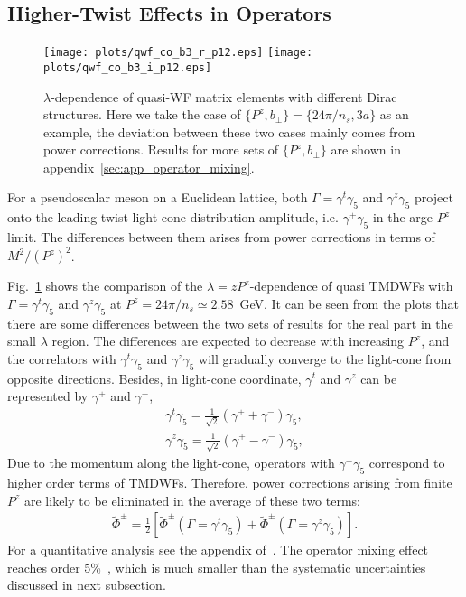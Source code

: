 \documentclass[prd,aps,twocolumn,preprintnumbers, showpacs, nofootinbib,superscriptaddress,notitlepage]{revtex4-1}
\begin{document}
\subsection{Higher-Twist Effects in Operators}
\label{sec:operator}


\begin{figure}
\centering
\texttt{[image: plots/qwf\_co\_b3\_r\_p12.eps]}
\texttt{[image: plots/qwf\_co\_b3\_i\_p12.eps]}
\caption{$\lambda$-dependence of quasi-WF matrix elements with different Dirac structures. Here we take the case of $\{P^z,b_{\perp}\}=\{24\pi/n_s,3a\}$ as an example, the deviation between these two cases mainly comes from power corrections. Results for more sets of $\{P^z,b_{\perp}\}$ are shown in appendix~\ref{sec:app_operator_mixing}.}
    \label{fig:qwf_coordinate}
\end{figure}


For a pseudoscalar meson on a Euclidean lattice, both $\Gamma=\gamma^t\gamma_5$ and $\gamma^z\gamma_5$ project onto the leading twist light-cone distribution amplitude, i.e. $\gamma^+\gamma_5$ in the arge $P^z$ limit. The differences  between them arises from power corrections in terms of $M^2/\left(P^z\right)^2$.

Fig.~\ref{fig:qwf_coordinate} shows the comparison of the $\lambda= z   P^z$-dependence of quasi TMDWFs with $\Gamma=\gamma^t\gamma_5$ and $\gamma^z\gamma_5$ at $P^z=24\pi/n_s\simeq2.58$~GeV. It can be seen from the plots that there are some differences between the two sets of results for the real part in  the small $\lambda$ region. The differences are expected to decrease with increasing $P^z$, and the correlators with $\gamma^t\gamma_5$ and $\gamma^z\gamma_5$ will gradually converge to the light-cone from opposite directions. Besides, in light-cone coordinate, $\gamma^t$ and $\gamma^z$ can be represented by $\gamma^+$ and $\gamma^-$,
\begin{align}
\gamma^t\gamma_5=\frac{1}{\sqrt{2}}(\gamma^++\gamma^-)\gamma_5,\nonumber\\
\gamma^z\gamma_5=\frac{1}{\sqrt{2}}(\gamma^+-\gamma^-)\gamma_5,
\end{align}
Due to the momentum along the light-cone, operators with $\gamma^-\gamma_5$ correspond to higher order terms of TMDWFs. Therefore, power corrections arising from finite $P^z$ are likely to be eliminated in the average of these two terms:
\begin{align}
\tilde{\Phi}^{\pm}=\frac{1}{2}\left[\tilde{\Phi}^{\pm}\left(\Gamma=\gamma^t\gamma_5\right) + \tilde{\Phi}^{\pm}\left(\Gamma=\gamma^z\gamma_5\right)\right].
\end{align}
For a quantitative analysis see the appendix of~\cite{LatticeParton:2020uhz}. The operator mixing effect reaches order 5\%~\cite{LatticeParton:2020uhz}, which is much smaller than the systematic uncertainties discussed in next subsection. 
\end{document}
